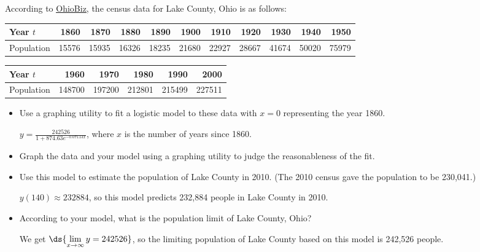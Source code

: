 \documentclass{ximera}
\begin{document}
\begin{problem}
    According to \href{http://www.ohiobiz.com/census/Lake.pdf}{\underline{OhioBiz}}, the census data for Lake County, Ohio is as follows:

\begin{tabular}{|l|r|r|r|r|r|r|r|r|r|r|} \hline
Year $t$ & 1860 & 1870 & 1880 & 1890 & 1900 & 1910 & 1920 & 1930 & 1940 & 1950 \\ \hline 
Population& 15576 & 15935 & 16326 & 18235 & 21680 & 22927 & 28667 & 41674 & 50020 & 75979 \\ \hline
\end{tabular}

\begin{tabular}{|l|r|r|r|r|r|} \hline
Year $t$ & 1960 & 1970 & 1980 & 1990 & 2000 \\ \hline 
Population& 148700 & 197200 & 212801 & 215499 & 227511 \\ \hline
\end{tabular}



\begin{itemize}
    \item 
    Use a graphing utility to fit a logistic model to these data with $x = 0$ representing the year 1860.

\begin{solution}
$y = \frac{242526}{1+874.63e^{-0.07113x}}$, where $x$ is the number of years since 1860.
\end{solution}

\item 
     Graph the data and your model using a graphing utility to judge the reasonableness of the fit.

\begin{solution}
\begin{center} 
\end{center}
\end{solution}

\item 
    Use this model to estimate the population of Lake County in 2010.  (The 2010 census gave the population to be 230,041.)

\begin{solution}
$y(140) \approx 232884$, so this model predicts 232,884 people in Lake County in 2010.
\end{solution}

\item 
    According to your model, what is the population limit of Lake County, Ohio?

\begin{solution}
We get $\ds{\lim_{x \rightarrow \infty} y = 242526}$, so the limiting population of Lake County based on this model is 242,526 people.
\end{solution}
\end{itemize}

\end{problem}
\end{document}
